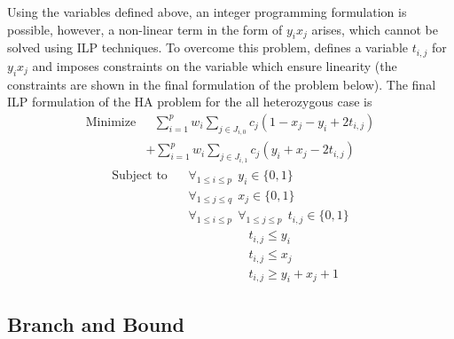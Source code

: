 \documentclass[10pt,twocolumn]{article}
\begin{document}
Using the variables defined above, an integer programming formulation is possible, however, a non-linear 
term in the form of $y_ix_j$ arises, which cannot be solved using ILP techniques. To overcome this problem, 
\cite{chen:2013} defines a variable $t_{i,j}$ for $y_ix_j$ and imposes constraints on the variable which 
ensure linearity (the constraints are shown in the final formulation of the problem below). The final ILP 
formulation of the HA problem for the all heterozygous case is 
\begin{equation*}
\begin{split}
    \textrm{Minimize} 
    &\ \ \ \sum_{i = 1}^{p}{w_i} \sum_{j \in J_{i, 0} }^{}{c_j(1 - x_j - y_i + 2t_{i,j})}                 \\
    &+ \sum_{i = 1}^{p}{w_i} \sum_{j \in J_{i, 1}}^{}{c_j(y_i + x_j - 2t_{i,j})}                
\end{split}
\end{equation*}
\begin{equation*}
\begin{split}
    \textrm{Subject to} 
    &\ \ \ \ \forall_{1 \le i \le p} \ \ y_i \in \{0, 1\}                                                 \\
    &\ \ \ \ \forall_{1 \le j \le q} \ \ x_j \in \{0, 1\}                                                 \\
    &\ \ \ \ \forall_{1 \le i \le p} \ \ \forall_{1 \le j \le p} \ \ t_{i,j} \in \{0, 1\}                 \\
    &\ \ \ \ \ \ \ \ \ \ \ \ \ \ \ \ \ \ \ \ \ \ \ \ \ \ t_{i,j} \le y_i                                  \\ 
    &\ \ \ \ \ \ \ \ \ \ \ \ \ \ \ \ \ \ \ \ \ \ \ \ \ \ t_{i,j} \le x_j                                  \\ 
    &\ \ \ \ \ \ \ \ \ \ \ \ \ \ \ \ \ \ \ \ \ \ \ \ \ \ t_{i,j} \ge y_i + x_j + 1              
    \end{split}
\end{equation*}


\subsection{Branch and Bound} \label{sec:bnb}
\end{document}
